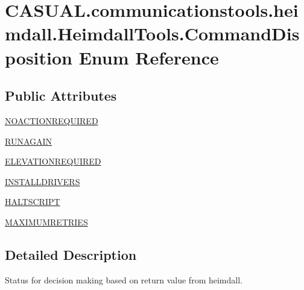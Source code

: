 \hypertarget{enum_c_a_s_u_a_l_1_1communicationstools_1_1heimdall_1_1_heimdall_tools_1_1_command_disposition}{\section{C\-A\-S\-U\-A\-L.\-communicationstools.\-heimdall.\-Heimdall\-Tools.\-Command\-Disposition Enum Reference}
\label{enum_c_a_s_u_a_l_1_1communicationstools_1_1heimdall_1_1_heimdall_tools_1_1_command_disposition}
}
\subsection*{Public Attributes}
\begin{DoxyCompactItemize}
\item 
\hyperlink{enum_c_a_s_u_a_l_1_1communicationstools_1_1heimdall_1_1_heimdall_tools_1_1_command_disposition_a0ebc34041019a8eabf595f1ffe000bbe}{N\-O\-A\-C\-T\-I\-O\-N\-R\-E\-Q\-U\-I\-R\-E\-D}
\item 
\hyperlink{enum_c_a_s_u_a_l_1_1communicationstools_1_1heimdall_1_1_heimdall_tools_1_1_command_disposition_af7c6c32e63677f4cd76c37549fece3bf}{R\-U\-N\-A\-G\-A\-I\-N}
\item 
\hyperlink{enum_c_a_s_u_a_l_1_1communicationstools_1_1heimdall_1_1_heimdall_tools_1_1_command_disposition_a55585fc6fa697d8ff0c09a924690dde2}{E\-L\-E\-V\-A\-T\-I\-O\-N\-R\-E\-Q\-U\-I\-R\-E\-D}
\item 
\hyperlink{enum_c_a_s_u_a_l_1_1communicationstools_1_1heimdall_1_1_heimdall_tools_1_1_command_disposition_abf1008a28a2e7fdff1cca67cf094a78a}{I\-N\-S\-T\-A\-L\-L\-D\-R\-I\-V\-E\-R\-S}
\item 
\hyperlink{enum_c_a_s_u_a_l_1_1communicationstools_1_1heimdall_1_1_heimdall_tools_1_1_command_disposition_a5efbc1618df4c2115bdc40d3096f9bd7}{H\-A\-L\-T\-S\-C\-R\-I\-P\-T}
\item 
\hyperlink{enum_c_a_s_u_a_l_1_1communicationstools_1_1heimdall_1_1_heimdall_tools_1_1_command_disposition_a067f4195d8242668a6d94ab67cc50c99}{M\-A\-X\-I\-M\-U\-M\-R\-E\-T\-R\-I\-E\-S}
\end{DoxyCompactItemize}


\subsection{Detailed Description}
Status for decision making based on return value from heimdall.

